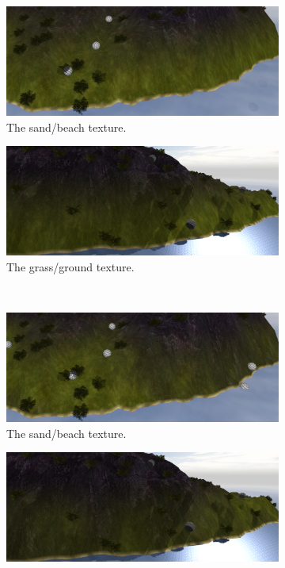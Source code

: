 \begin{figure}[H]
\begin{subfigure}{.5\textwidth}
  \centering
  \includegraphics[width=0.9\linewidth]{images/textureBlendingComparison1_simple.png}
  \caption{The sand/beach texture.}
  \label{fig:textureSand}
\end{subfigure}%
\begin{subfigure}{.5\textwidth}
  \centering
  \includegraphics[width=0.9\linewidth]{images/textureBlendingComparison2_simple.png}
  \caption{The grass/ground texture.}
  \label{fig:textureGrass}
\end{subfigure}
\\
\begin{subfigure}{.5\textwidth}
  \centering
  \includegraphics[width=0.9\linewidth]{images/textureBlendingComparison1_advanced.png}
  \caption{The sand/beach texture.}
  \label{fig:textureSand}
\end{subfigure}%
\begin{subfigure}{.5\textwidth}
  \centering
  \includegraphics[width=0.9\linewidth]{images/textureBlendingComparison2_advanced.png}

\end{subfigure}
\end{figure}
